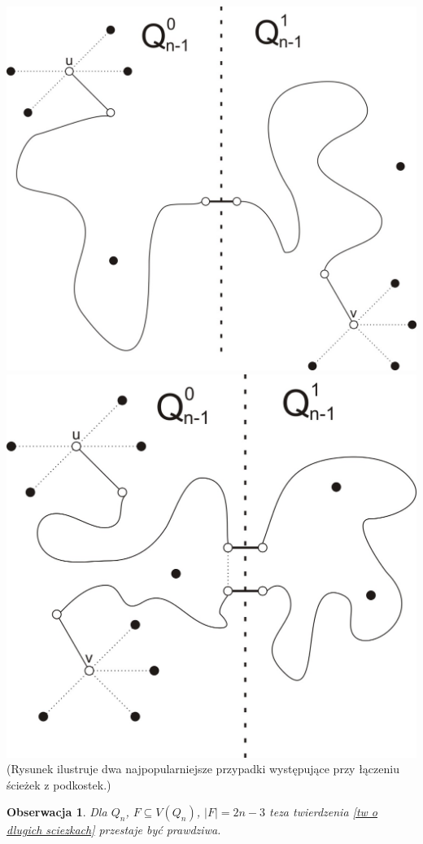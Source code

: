 \documentclass{pracamgr}
\newtheorem{observation}[theorem]{Obserwacja}
\begin{document}
   \includegraphics[scale=0.5]{img/sciezka_laczenie1.jpg}\quad\quad\quad\quad
   \includegraphics[scale=0.5]{img/sciezka_laczenie2.jpg}\newline
   (Rysunek ilustruje dwa najpopularniejsze przypadki występujące przy łączeniu ścieżek z podkostek.)\newline
   \begin{observation}\label{dluga sciezka 2n-3 za duzo}
    Dla $Q_n$, $F\subseteq V(Q_n)$, $|F|=2n-3$ teza twierdzenia \ref{tw o dlugich sciezkach} przestaje być prawdziwa.
   \end{observation}
\end{document}
